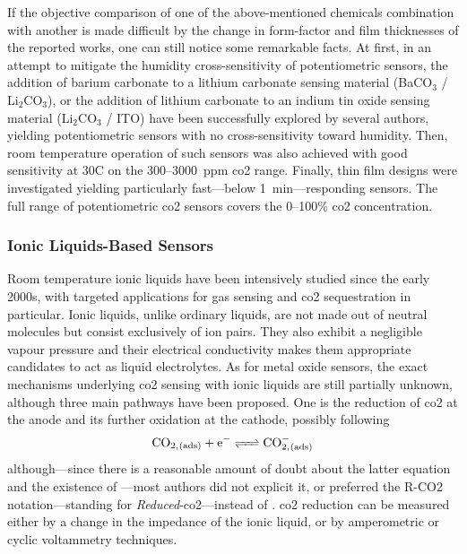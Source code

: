 If the objective comparison of one of the above-mentioned chemicals combination with another is made difficult by the change in form-factor and film thicknesses of the reported works, one can still notice some remarkable facts. At first, in an attempt to mitigate the humidity cross-sensitivity of potentiometric sensors, the addition of barium carbonate to a lithium carbonate sensing material (BaCO$_3$ / Li$_2$CO$_3$)\cite{kishi2007, lee2009li, lee2015hk}, or the addition of lithium carbonate to an indium tin oxide sensing material (Li$_2$CO$_3$ / ITO)\cite{obata2003} have been successfully explored by several authors, yielding potentiometric sensors with no cross-sensitivity toward humidity. Then, room temperature operation of such sensors was also achieved with good sensitivity at 30{\degree}C on the 300--3000~ppm \gls{co2} range\cite{obata2003}. Finally, thin film designs were investigated yielding particularly fast---below 1~min---responding sensors\cite{choi2013, lee2014, lee2015hk}. The full range of potentiometric \gls{co2} sensors covers the 0--100\% \gls{co2} concentration.

\subsubsection{Ionic Liquids-Based Sensors}\label{subsect:choos:review:ionic_liquids}

Room temperature ionic liquids have been intensively studied since the early 2000s, with targeted applications for gas sensing and \gls{co2} sequestration in particular\cite{barrosse2010, rehman2015, behera2015, wasilewski2020}. Ionic liquids, unlike ordinary liquids, are not made out of neutral molecules but consist exclusively of ion pairs. They also exhibit a negligible vapour pressure and their electrical conductivity makes them appropriate candidates to act as liquid electrolytes. As for metal oxide sensors, the exact mechanisms underlying \gls{co2} sensing with ionic liquids are still partially unknown, although three main pathways have been proposed. One is the reduction of \gls{co2} at the anode and its further oxidation at the cathode, possibly following\cite{fapyane2020}
\begin{equation}
	\ce{CO_{2,(ads)} + e^- <=> CO^-_{2,(ads)}}
\end{equation}
although---since there is a reasonable amount of doubt about the latter equation and the existence of ---most authors did not explicit it, or preferred the R-CO2 notation---standing for \emph{Reduced}-\gls{co2}---instead of \cite{rosen2010}. \gls{co2} reduction can be measured either by a change in the impedance of the ionic liquid\cite{li2012, honda2012, ishizu2013, willa2015, willa2017}, or by amperometric or cyclic voltammetry techniques\cite{rosen2010, fapyane2020, revsbech2019}.

